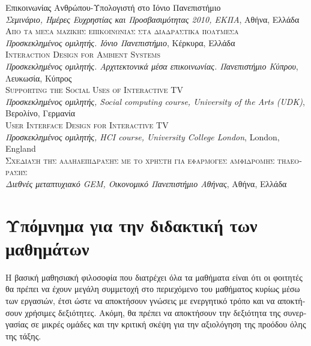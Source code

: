 \documentclass[11pt, a4paper]{article}
\newcommand{\note}[1]{\marginnote{\scriptsize #1}}
\begin{document}
\begin{greek}
{Επικοινωνίας Ανθρώπου-Υπολογιστή στο Ιόνιο Πανεπιστήμιο}\\
\emph{Σεμινάριο, Ημέρες Ευχρηστίας και Προσβασιμότητας 2010,
ΕΚΠΑ}, Αθήνα, Ελλάδα\\[.2cm]
\note{2007}\textsc{Από τα μέσα μαζικής επικοινωνίας στα διαδραστικά
πολυμέσα}\\
\emph{Προσκεκλημένος ομιλητής. Ιόνιο Πανεπιστήμιο}, Κέρκυρα,
Ελλάδα\\[.2cm]
\note{2006}\textsc{Interaction Design for Ambient Systems}\\
\emph{Προσκεκλημένος ομιλητής. Αρχιτεκτονικά μέσα επικοινωνίας.
Πανεπιστήμιο Κύπρου}, Λευκωσία, Κύπρος\\[.2cm]
\note{2006}\textsc{Supporting the Social Uses of Interactive TV}\\
\emph{Προσκεκλημένος ομιλητής, Social computing course, University of
the Arts (UDK)}, Βερολίνο, Γερμανία\\[.2cm]
\note{2005}\textsc{User Interface Design for Interactive TV}\\
\emph{Προσκεκλημένος ομιλητής, HCI course, University College
London}, London, England\\[.2cm]
\note{2002}\textsc{Σχεδίαση της αλληλεπίδρασης με το χρήστη για
εφαρμογές αμφίδρομης τηλεόρασης}\\
\emph{Διεθνές μεταπτυχιακό GEM, Οικονομικό Πανεπιστήμιο Αθήνας}, Αθήνα,
Ελλάδα\\[.2cm]

\hypertarget{ux3c5ux3c0ux3ccux3bcux3bdux3b7ux3bcux3b1-ux3b3ux3b9ux3b1-ux3c4ux3b7ux3bd-ux3b4ux3b9ux3b4ux3b1ux3baux3c4ux3b9ux3baux3ae-ux3c4ux3c9ux3bd-ux3bcux3b1ux3b8ux3b7ux3bcux3acux3c4ux3c9ux3bd}{%
\section{Υπόμνημα για την διδακτική των
μαθημάτων}\label{ux3c5ux3c0ux3ccux3bcux3bdux3b7ux3bcux3b1-ux3b3ux3b9ux3b1-ux3c4ux3b7ux3bd-ux3b4ux3b9ux3b4ux3b1ux3baux3c4ux3b9ux3baux3ae-ux3c4ux3c9ux3bd-ux3bcux3b1ux3b8ux3b7ux3bcux3acux3c4ux3c9ux3bd}}

Η βασική μαθησιακή φιλοσοφία που διατρέχει όλα τα μαθήματα είναι ότι οι
φοιτητές θα πρέπει να έχουν μεγάλη συμμετοχή στο περιεχόμενο του
μαθήματος κυρίως μέσω των εργασιών, έτσι ώστε να αποκτήσουν γνώσεις με
ενεργητικό τρόπο και να αποκτήσουν χρήσιμες δεξιότητες. Ακόμη, θα πρέπει
να αποκτήσουν την δεξιότητα της συνεργασίας σε μικρές ομάδες και την
κριτική σκέψη για την αξιολόγηση της προόδου όλης της τάξης.


\end{greek}
\end{document}
